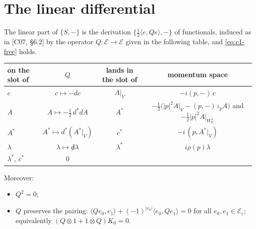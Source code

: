\section{The linear differential}

\begin{proposition}
\label{prop:c1-Q}
The linear part of $\{S,-\}$ is the derivation $\{\tfrac12\langle e,Qe\rangle,-\}$ of functionals, induced as in [C07, §6.2] by the operator $Q\colon\mathscr E\to\mathscr E$ given in the following table, and \eqref{eq:c1-free} holds.

\begin{tabular}{l|c|c|c}
on the slot of & $Q$ & lands in the slot of & momentum space \\
\hline
$c$ & $c\mapsto-dc$ & $A|_V$ & $-i(p,-)\,c$ \\
$A$ & $A\mapsto-\tfrac12\,d^*dA$ & $A^*$ & $-\tfrac12\big(|p|^2A|_V-(p,-)\,\iota_pA\big)$ and $-\tfrac12|p|^2A|_{W_{\mathbb R}^\perp}$ \\
$A^*$ & $A^*\mapsto d^*(A^*|_V)$ & $c^*$ & $-i\,(p,A^*|_V)$ \\
$\lambda$ & $\lambda\mapsto{\not d}\lambda$ & $\lambda^*$ & $i\rho(p)\lambda$ \\
$\lambda^*$, $c^*$ & $0$ & & \\
\end{tabular}

Moreover:
\begin{itemize}
\item $Q^2=0$;
\item $Q$ preserves the pairing: $\langle Qe_0,e_1\rangle+(-1)^{|e_0|}\langle e_0,Qe_1\rangle=0$ for all $e_0,e_1\in\mathscr E_c$; equivalently $(Q\otimes1+1\otimes Q)K_0=0$.
\end{itemize}
\end{proposition}


